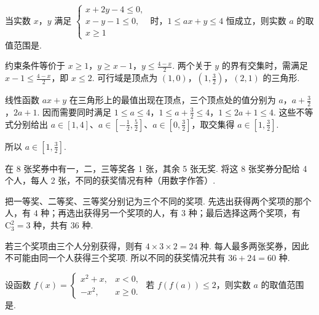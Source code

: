 \begin{problem}
当实数 \(x\)，\(y\) 满足 \(\begin{cases}
x + 2y - 4 \leqslant 0,\\
x - y - 1 \leqslant 0,\\
x \geqslant 1
\end{cases}\) 时，\(1 \leqslant ax + y \leqslant 4\) 恒成立，则实数 \(a\) 的取值范围是\fillinblank{}.
\end{problem}

\begin{solution}
约束条件等价于 \(x\geqslant1\)，\(y\geqslant x-1\)，\(y\leqslant\frac{4-x}{2}\). 两个关于 \(y\) 的界有交集时，需满足 \(x-1\leqslant\frac{4-x}{2}\)，即 \(x\leqslant2\). 可行域是顶点为 \((1,0)\)，\((1,\frac32)\)，\((2,1)\) 的三角形.

线性函数 \(ax+y\) 在三角形上的最值出现在顶点，三个顶点处的值分别为 \(a\)，\(a+\frac32\)，\(2a+1\). 因而需要同时满足
\(1\leqslant a\leqslant4\)，\(1\leqslant a+\frac32\leqslant4\)，\(1\leqslant2a+1\leqslant4\).
这些不等式分别给出 \(a\in[1,4]\)、\(a\in[-\frac12,\frac52]\)、\(a\in[0,\frac32]\)，取交集得 \(a\in[1,\frac32]\).

所以 \(a\in\left[1,\frac32\right]\).
\end{solution}

\begin{problem}
在 8 张奖券中有一，二，三等奖各 1 张，其余 5 张无奖. 将这 8 张奖券分配给 4 个人，每人 2 张，不同的获奖情况有\fillinblank{}种（用数字作答）.
\end{problem}

\begin{solution}
把一等奖、二等奖、三等奖分别记为三个不同的奖项. 先选出获得两个奖项的那个人，有 \(4\) 种；再选出获得另一个奖项的人，有 \(3\) 种；最后选择这两个奖项，有 \(\mathrm C_3^2=3\) 种，共有 \(36\) 种.

若三个奖项由三个人分别获得，则有 \(4\times3\times2=24\) 种. 每人最多两张奖券，因此不可能由同一个人获得三个奖项. 所以不同的获奖情况共有 \(36+24=60\) 种.
\end{solution}

\begin{problem}
设函数 \( f(x) = \begin{cases}
x^2 + x, & x < 0,\\
-x^2, & x \geqslant 0.
\end{cases} \) 若 \( f(f(a)) \leqslant 2 \)，则实数 \(a\) 的取值范围是\fillinblank{}.
\answer{\((-\infty,\sqrt{2}]\)}
\end{problem}


